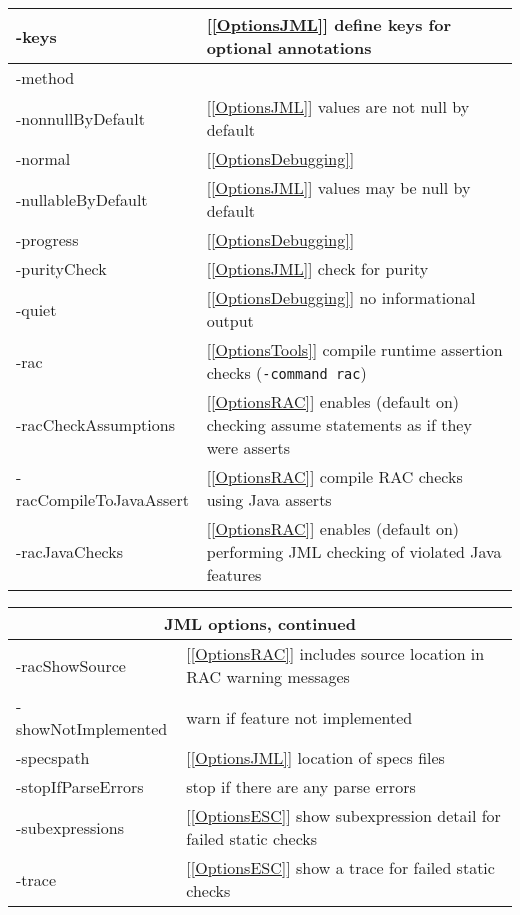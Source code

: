 \begin{table}
{\begin{tabular}{|l|p{1.4in}|}
-keys & [\ref{OptionsJML}] define keys for optional annotations \\ \hline
-method & \\ \hline
-nonnullByDefault & [\ref{OptionsJML}] values are not null by default \\ \hline
-normal & [\ref{OptionsDebugging}] \\ \hline
-nullableByDefault & [\ref{OptionsJML}] values may be null by default\\ \hline
-progress & [\ref{OptionsDebugging}] \\ \hline
-purityCheck & [\ref{OptionsJML}] check for purity \\ \hline
-quiet & [\ref{OptionsDebugging}] no informational output \\ \hline
-rac & [\ref{OptionsTools}] compile runtime assertion checks ({\tt -command rac})\\ \hline
-racCheckAssumptions & [\ref{OptionsRAC}] enables (default on) checking assume statements as if they were asserts \\ \hline
-racCompileToJavaAssert & [\ref{OptionsRAC}] compile RAC checks using Java asserts \\ \hline
-racJavaChecks & [\ref{OptionsRAC}] enables (default on) performing JML checking of violated Java features \\ \hline
\end{tabular}
}
\qquad
\parbox{.5\textwidth}{

\begin{tabular}{|l|p{1.4in}|}
\hline
\multicolumn{2}{|c|}{JML options, continued} \\
\hline
-racShowSource & [\ref{OptionsRAC}] includes source location in RAC warning messages \\ \hline
-showNotImplemented & warn if feature not implemented\\ \hline
-specspath & [\ref{OptionsJML}] location of specs files\\ \hline
-stopIfParseErrors & stop if there are any parse errors \\ \hline
-subexpressions & [\ref{OptionsESC}] show subexpression detail for failed static checks\\ \hline
-trace & [\ref{OptionsESC}] show a trace for failed static checks\\ \hline

\end{tabular}

\vspace*{.5in}

}
\end{table}
